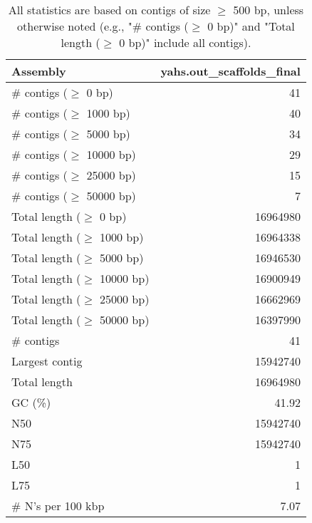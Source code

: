 \documentclass[12pt,a4paper]{article}
\begin{document}
\begin{table}[ht]
\begin{center}
\caption{All statistics are based on contigs of size $\geq$ 500 bp, unless otherwise noted (e.g., "\# contigs ($\geq$ 0 bp)" and "Total length ($\geq$ 0 bp)" include all contigs).}
\begin{tabular}{|l*{1}{|r}|}
\hline
Assembly & yahs.out\_scaffolds\_final \\ \hline
\# contigs ($\geq$ 0 bp) & 41 \\ \hline
\# contigs ($\geq$ 1000 bp) & 40 \\ \hline
\# contigs ($\geq$ 5000 bp) & 34 \\ \hline
\# contigs ($\geq$ 10000 bp) & 29 \\ \hline
\# contigs ($\geq$ 25000 bp) & 15 \\ \hline
\# contigs ($\geq$ 50000 bp) & 7 \\ \hline
Total length ($\geq$ 0 bp) & 16964980 \\ \hline
Total length ($\geq$ 1000 bp) & 16964338 \\ \hline
Total length ($\geq$ 5000 bp) & 16946530 \\ \hline
Total length ($\geq$ 10000 bp) & 16900949 \\ \hline
Total length ($\geq$ 25000 bp) & 16662969 \\ \hline
Total length ($\geq$ 50000 bp) & 16397990 \\ \hline
\# contigs & 41 \\ \hline
Largest contig & 15942740 \\ \hline
Total length & 16964980 \\ \hline
GC (\%) & 41.92 \\ \hline
N50 & 15942740 \\ \hline
N75 & 15942740 \\ \hline
L50 & 1 \\ \hline
L75 & 1 \\ \hline
\# N's per 100 kbp & 7.07 \\ \hline
\end{tabular}
\end{center}
\end{table}
\end{document}
